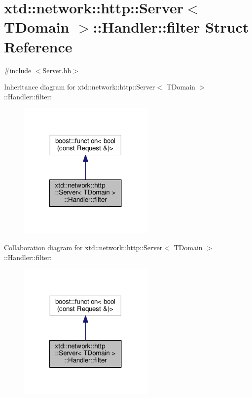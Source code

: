 \hypertarget{structxtd_1_1network_1_1http_1_1Server_1_1Handler_1_1filter}{\section{xtd\-:\-:network\-:\-:http\-:\-:Server$<$ T\-Domain $>$\-:\-:Handler\-:\-:filter Struct Reference}
\label{structxtd_1_1network_1_1http_1_1Server_1_1Handler_1_1filter}
}


{\ttfamily \#include $<$Server.\-hh$>$}



Inheritance diagram for xtd\-:\-:network\-:\-:http\-:\-:Server$<$ T\-Domain $>$\-:\-:Handler\-:\-:filter\-:
\nopagebreak
\begin{figure}[H]
\begin{center}
\leavevmode
\includegraphics[width=188pt]{structxtd_1_1network_1_1http_1_1Server_1_1Handler_1_1filter__inherit__graph}
\end{center}
\end{figure}


Collaboration diagram for xtd\-:\-:network\-:\-:http\-:\-:Server$<$ T\-Domain $>$\-:\-:Handler\-:\-:filter\-:
\nopagebreak
\begin{figure}[H]
\begin{center}
\leavevmode
\includegraphics[width=188pt]{structxtd_1_1network_1_1http_1_1Server_1_1Handler_1_1filter__coll__graph}
\end{center}
\end{figure}
